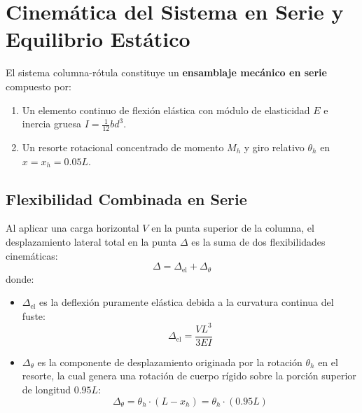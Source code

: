 \documentclass[11pt,letterpaper]{article}
\begin{document}
\section{Cinemática del Sistema en Serie y Equilibrio Estático}

El sistema columna-rótula constituye un \textbf{ensamblaje mecánico en serie} compuesto por:
\begin{enumerate}
    \item Un elemento continuo de flexión elástica con módulo de elasticidad $E$ e inercia gruesa $I = \frac{1}{12} b d^3$.
    \item Un resorte rotacional concentrado de momento $M_h$ y giro relativo $\theta_h$ en $x = x_h = 0.05 L$.
\end{enumerate}

\subsection{Flexibilidad Combinada en Serie}
Al aplicar una carga horizontal $V$ en la punta superior de la columna, el desplazamiento lateral total en la punta $\Delta$ es la suma de dos flexibilidades cinemáticas:
\begin{equation}
\Delta = \Delta_{\text{el}} + \Delta_{\theta}
\label{eq:delta_suma}
\end{equation}
donde:
\begin{itemize}
    \item $\Delta_{\text{el}}$ es la deflexión puramente elástica debida a la curvatura continua del fuste:
    \begin{equation}
    \Delta_{\text{el}} = \frac{V L^3}{3 E I}
    \label{eq:delta_el}
    \end{equation}
    \item $\Delta_{\theta}$ es la componente de desplazamiento originada por la rotación $\theta_h$ en el resorte, la cual genera una rotación de cuerpo rígido sobre la porción superior de longitud $0.95 L$:
    \begin{equation}
    \Delta_{\theta} = \theta_h \cdot (L - x_h) = \theta_h \cdot (0.95 L)
    \label{eq:delta_theta}
    \end{equation}
\end{itemize}
\end{document}
